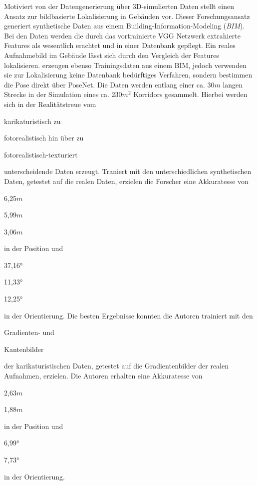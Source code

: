 Motiviert von der Datengenerierung über 3D-simulierten Daten stellt \citet{haImagebasedIndoorLocalization2018} einen Ansatz zur bildbasierte Lokalisierung in Gebäuden vor. Dieser Forschungsansatz generiert synthetische Daten aus einem Building-Information-Modeling (\textit{BIM}). Bei den Daten werden die durch das vortrainierte VGG Netzwerk \cite{simonyanVeryDeepConvolutional2014} extrahierte Features als wesentlich erachtet und in einer Datenbank gepflegt. Ein reales Aufnahmebild im Gebäude lässt sich durch den Vergleich der Features lokalisieren. \citet{acharyaBIMPoseNetIndoorCamera2019, acharyaMODELLINGUNCERTAINTYSINGLE2019} erzeugen ebenso Trainingsdaten aus einem BIM, jedoch verwenden sie zur Lokalisierung keine Datenbank bedürftiges Verfahren, sondern bestimmen die Pose direkt über PoseNet. Die Daten werden entlang einer ca. 30$m$ langen Strecke in der Simulation eines ca. 230$m^2$ Korridors gesammelt. Hierbei werden sich in der Realitätstreue vom \begin{enumerate*}[label=\alph*)]
	\item karikaturistisch zu
	\item fotorealistisch hin über zu
	\item fotorealistisch-texturiert
\end{enumerate*} unterscheidende Daten erzeugt.
Traniert mit den unterschiedlichen synthetischen Daten, getestet auf die realen Daten, erzielen die Forscher eine Akkuratesse von
\begin{enumerate*}[label=\alph*)]
	\item 6,25$m$
	\item 5,99$m$
	\item 3,06$m$
\end{enumerate*}
 in der Position und  
 \begin{enumerate*}[label=\alph*)]
 	\item 37,16°
 	\item 11,33°
 	\item 12,25°
 \end{enumerate*}
 in der Orientierung.
Die besten Ergebnisse konnten die Autoren trainiert mit den 
\begin{enumerate*}[label=\alph*)]
	\addtocounter{enumi}{3}
	\item Gradienten- und
	\item Kantenbilder
\end{enumerate*} der karikaturistischen Daten, getestet auf die Gradientenbilder der realen Aufnahmen, erzielen. Die Autoren erhalten eine Akkuratesse von 
\begin{enumerate*}[label=\alph*)]
	\addtocounter{enumi}{3}
	\item 2,63$m$
	\item 1,88$m$
\end{enumerate*}
in der Position und  
 \begin{enumerate*}[label=\alph*)]
 	\addtocounter{enumi}{3}
	\item 6,99°
	\item 7,73°
\end{enumerate*}
in der Orientierung.

